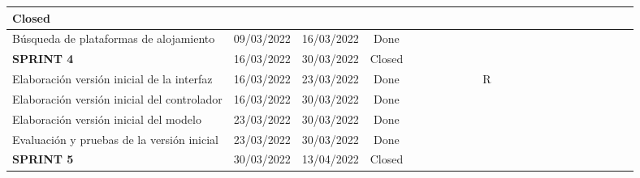 \begin{landscape}
\begin{table}[h]
{\begin{tabular}{|lccc|l|l|l|l|l|l|l|l|l|l|l|l|l|l|l|l|l|l|l|}
  \cellcolor[HTML]{C0C0C0}Closed &
   &
   &
   &
   &
  \cellcolor[HTML]{A1E8A8} &
   &
   &
   &
   &
   &
   &
   &
   &
   &
   &
   &
   &
   &
   \\ \hline
\multicolumn{1}{|l|}{Búsqueda de plataformas de alojamiento} &
  \multicolumn{1}{c|}{09/03/2022} &
  \multicolumn{1}{c|}{16/03/2022} &
  Done &
   &
   &
   &
   &
  \cellcolor[HTML]{07BB30} &
   &
  \multicolumn{1}{c|}{} &
   &
   &
   &
   &
   &
   &
   &
   &
   &
   &
   &
   \\ \hline
\multicolumn{1}{|l|}{\cellcolor[HTML]{C0C0C0}\textbf{SPRINT 4}} &
  \multicolumn{1}{c|}{\cellcolor[HTML]{C0C0C0}16/03/2022} &
  \multicolumn{1}{c|}{\cellcolor[HTML]{C0C0C0}30/03/2022} &
  \cellcolor[HTML]{C0C0C0}Closed &
   &
   &
   &
   &
   &
  \cellcolor[HTML]{A1E8A8} &
  \cellcolor[HTML]{A1E8A8} &
   &
   &
   &
   &
   &
   &
   &
   &
   &
   &
   &
   \\ \hline
\multicolumn{1}{|l|}{Elaboración versión inicial de la interfaz} &
  \multicolumn{1}{c|}{16/03/2022} &
  \multicolumn{1}{c|}{23/03/2022} &
  Done &
   &
   &
   &
   &
   &
  \cellcolor[HTML]{07BB30} &
  \multicolumn{1}{c|}{\cellcolor[HTML]{FFFFC7}R} &
   &
   &
   &
   &
   &
   &
   &
   &
   &
   &
   &
   \\ \hline
\multicolumn{1}{|l|}{Elaboración versión inicial del controlador} &
  \multicolumn{1}{c|}{16/03/2022} &
  \multicolumn{1}{c|}{30/03/2022} &
  Done &
   &
   &
   &
   &
   &
  \cellcolor[HTML]{07BB30} &
  \cellcolor[HTML]{07BB30} &
   &
   &
   &
   &
   &
   &
   &
   &
   &
   &
   &
   \\ \hline
\multicolumn{1}{|l|}{Elaboración versión inicial del modelo} &
  \multicolumn{1}{c|}{23/03/2022} &
  \multicolumn{1}{c|}{30/03/2022} &
  Done &
   &
   &
   &
   &
   &
   &
  \cellcolor[HTML]{07BB30} &
   &
   &
   &
   &
   &
   &
   &
   &
   &
   &
   &
   \\ \hline
\multicolumn{1}{|l|}{Evaluación y pruebas de la versión inicial} &
  \multicolumn{1}{c|}{23/03/2022} &
  \multicolumn{1}{c|}{30/03/2022} &
  Done &
   &
   &
   &
   &
   &
   &
  \cellcolor[HTML]{07BB30} &
   &
   &
   &
   &
   &
   &
   &
   &
   &
   &
   &
   \\ \hline
\multicolumn{1}{|l|}{\cellcolor[HTML]{C0C0C0}\textbf{SPRINT 5}} &
  \multicolumn{1}{c|}{\cellcolor[HTML]{C0C0C0}30/03/2022} &
  \multicolumn{1}{c|}{\cellcolor[HTML]{C0C0C0}13/04/2022} &
  \cellcolor[HTML]{C0C0C0}Closed &
   &
   &
   &
   &
   &
   &
   &
  \cellcolor[HTML]{A1E8A8} &
  \cellcolor[HTML]{A1E8A8} &
   &
   &
   &

\end{tabular}}
\end{table}
\end{landscape}
